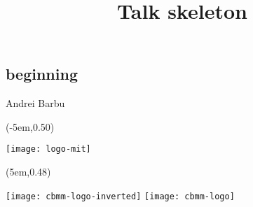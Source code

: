 



\title[skeleton]{Talk skeleton}

\author[Andrei Barbu]{}

\institute[MIT]{}

\date[August, 2018]{}


\lsstyle

\subsection{beginning}
\begin{frame}[plain]
  \titlepage
  \begin{center}
    \vspace{3ex}
    Andrei Barbu
    \begin{textblock*}{\paperwidth}(-5em,0.50\textheight)
      \begin{footnotesize}
        \texttt{[image: logo-mit]}
      \end{footnotesize}
    \end{textblock*}
    \begin{textblock*}{\paperwidth}(5em,0.48\textheight)
      \begin{footnotesize}
        \ifdefined\darkmode
        \texttt{[image: cbmm-logo-inverted]}
        \else
        \texttt{[image: cbmm-logo]}
        \fi
      \end{footnotesize}
    \end{textblock*}
  \end{center}
\end{frame}

\begin{frame}[plain]
  \centering
\end{frame}


